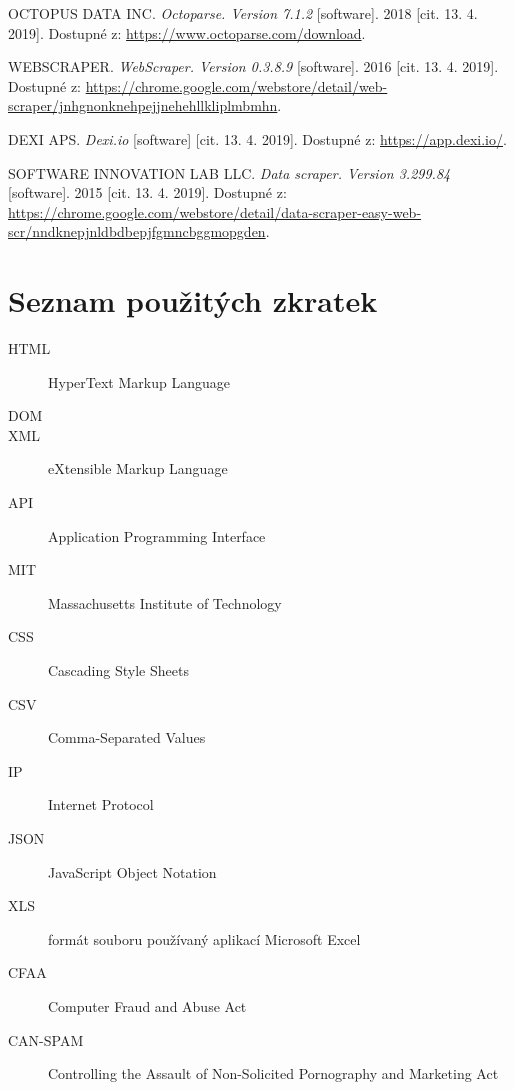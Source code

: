 \documentclass[thesis=B,czech]{FITthesis}[2012/06/26]
\begin{document}
\begin{thebibliography}{99}
	OCTOPUS DATA INC. \textit{Octoparse. Version 7.1.2} [software]. 2018 [cit. 13. 4. 2019]. Dostupné z: \url{https://www.octoparse.com/download}.
	
	WEBSCRAPER. \textit{WebScraper. Version 0.3.8.9} [software]. 2016 [cit. 13. 4. 2019]. Dostupné z: \url{https://chrome.google.com/webstore/detail/web-scraper/jnhgnonknehpejjnehehllkliplmbmhn}.
	
	DEXI APS. \textit{Dexi.io} [software] [cit. 13. 4. 2019]. Dostupné z: \url{https://app.dexi.io/}.
	
	 SOFTWARE INNOVATION LAB LLC. \textit{Data scraper. Version 3.299.84} [software]. 2015 [cit. 13. 4. 2019]. Dostupné z: \url{https://chrome.google.com/webstore/detail/data-scraper-easy-web-scr/nndknepjnldbdbepjfgmncbggmopgden}.
	
\end{thebibliography}

\appendix




\chapter{Seznam použitých zkratek}
\begin{description}
	\item[HTML] HyperText Markup Language
	\item[DOM] 
	\item[XML] eXtensible Markup Language
	\item[API] Application Programming Interface
	\item[MIT] Massachusetts Institute of Technology
	\item[CSS] Cascading Style Sheets
	\item[CSV] Comma-Separated Values
	\item[IP] Internet Protocol
	\item[JSON] JavaScript Object Notation
	\item[XLS] formát souboru používaný aplikací Microsoft Excel
	\item[CFAA] Computer Fraud and Abuse Act
	\item[CAN-SPAM] Controlling the Assault of Non-Solicited Pornography and Marketing Act
\end{description}

\end{document}
